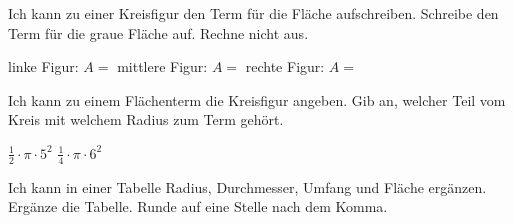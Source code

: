 \begin{aufgabe}{Ich kann zu einer Kreisfigur den Term für die Fläche aufschreiben.}
Schreibe den Term für die graue Fläche auf. Rechne nicht aus.

\begin{kreis}[1.4]\mittelpunkt{}\end{kreis}\hfill
\begin{kreis}[1.4]\mittelpunkt{}\end{kreis}\hfill
\begin{kreis}[1.4]\mittelpunkt{}\end{kreis}

\begin{teile}
\teil linke Figur: \quad $A =$ \leerfeld
\teil mittlere Figur: \quad $A =$ \leerfeld
\teil rechte Figur: \quad $A =$ \leerfeld
\end{teile}
\end{aufgabe}

\begin{aufgabe}{Ich kann zu einem Flächenterm die Kreisfigur angeben.}
Gib an, welcher Teil vom Kreis mit welchem Radius zum Term gehört.
\begin{teile}
\teil $\frac{1}{2} \cdot \pi \cdot 5^2$ \hfill \leerfeld \quad \leerfeld
\teil $\frac{1}{4} \cdot \pi \cdot 6^2$ \hfill \leerfeld \quad \leerfeld
\end{teile}
\end{aufgabe}

\begin{aufgabe}{Ich kann in einer Tabelle Radius, Durchmesser, Umfang und Fläche ergänzen.}
Ergänze die Tabelle. Runde auf eine Stelle nach dem Komma.


\end{aufgabe}

